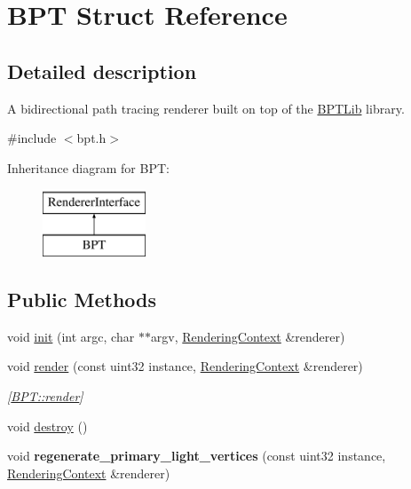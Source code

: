 \hypertarget{struct_b_p_t}{}\section{B\+PT Struct Reference}
\label{struct_b_p_t}


\subsection{Detailed description}
A bidirectional path tracing renderer built on top of the \hyperlink{_b_p_t_lib_page}{B\+P\+T\+Lib} library. 

{\ttfamily \#include $<$bpt.\+h$>$}

Inheritance diagram for B\+PT\+:\begin{figure}[H]
\begin{center}
\leavevmode
\includegraphics[height=2.000000cm]{struct_b_p_t}
\end{center}
\end{figure}
\subsection*{Public Methods}
\begin{DoxyCompactItemize}
\item 
void \hyperlink{struct_b_p_t_a45040344b72bde12d338c2b1969fba64}{init} (int argc, char $\ast$$\ast$argv, \hyperlink{struct_rendering_context}{Rendering\+Context} \&renderer)
\item 
\mbox{\label{struct_b_p_t_af9e940aca306f186cadfabc095590d88}} 
void \hyperlink{struct_b_p_t_af9e940aca306f186cadfabc095590d88}{render} (const uint32 instance, \hyperlink{struct_rendering_context}{Rendering\+Context} \&renderer)
\begin{DoxyCompactList}\small\item\em \mbox{[}\hyperlink{struct_b_p_t_af9e940aca306f186cadfabc095590d88}{B\+P\+T\+::render}\mbox{]} \end{DoxyCompactList}\item 
void \hyperlink{struct_b_p_t_aef80ec5312cbbf38e5dc9e6c37058825}{destroy} ()
\item 
\mbox{\label{struct_b_p_t_aebd1d213d108b75ffe3a10b87a16a556}} 
void {\bfseries regenerate\+\_\+primary\+\_\+light\+\_\+vertices} (const uint32 instance, \hyperlink{struct_rendering_context}{Rendering\+Context} \&renderer)
\end{DoxyCompactItemize}

